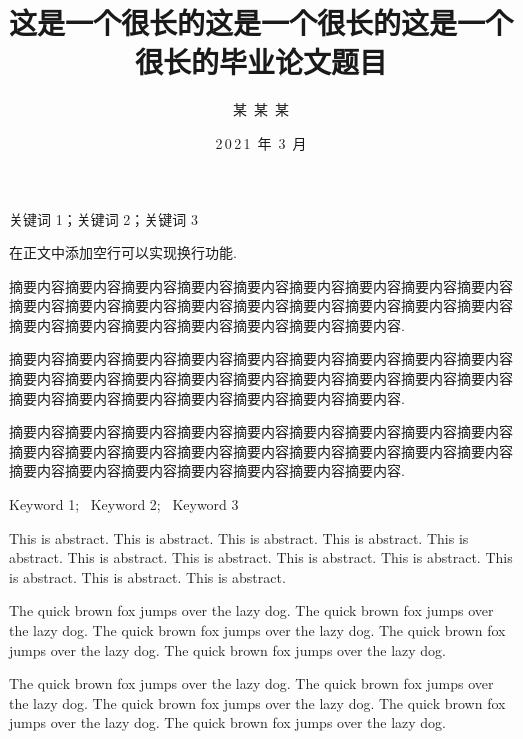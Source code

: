 \documentclass{shnuthesis}
\title{这是一个很长的这是一个很长的这是一个很长的毕业论文题目}
\author{某~某~某}    %
\date{2\,0\,2\,1~年~3~月}  %
\begin{document}
\frontmatter

\maketitle

% 

\makestatement


\clearpage   %



\begin{cnabstract}{关键词 1；关键词 2；关键词 3}

在正文中添加空行可以实现换行功能.
		
摘要内容摘要内容摘要内容摘要内容摘要内容摘要内容摘要内容摘要内容摘要内容摘要内容摘要内容摘要内容摘要内容摘要内容摘要内容摘要内容摘要内容摘要内容摘要内容摘要内容摘要内容摘要内容摘要内容摘要内容摘要内容.
		
摘要内容摘要内容摘要内容摘要内容摘要内容摘要内容摘要内容摘要内容摘要内容摘要内容摘要内容摘要内容摘要内容摘要内容摘要内容摘要内容摘要内容摘要内容摘要内容摘要内容摘要内容摘要内容摘要内容摘要内容摘要内容.

摘要内容摘要内容摘要内容摘要内容摘要内容摘要内容摘要内容摘要内容摘要内容摘要内容摘要内容摘要内容摘要内容摘要内容摘要内容摘要内容摘要内容摘要内容摘要内容摘要内容摘要内容摘要内容摘要内容摘要内容摘要内容.


\end{cnabstract}



\begin{enabstract}{Keyword 1;~ Keyword 2;~ Keyword 3}

This is abstract. This is abstract. This is abstract. This is abstract. This is abstract. This is abstract. This is abstract. This is abstract. This is abstract. This is abstract. This is abstract. This is abstract.
		
The quick brown fox jumps over the lazy dog. The quick brown fox jumps over the lazy dog. The quick brown fox jumps over the lazy dog. The quick brown fox jumps over the lazy dog. The quick brown fox jumps over the lazy dog.

The quick brown fox jumps over the lazy dog. The quick brown fox jumps over the lazy dog. The quick brown fox jumps over the lazy dog. The quick brown fox jumps over the lazy dog. The quick brown fox jumps over the lazy dog.


\end{enabstract}
	
\end{document}
